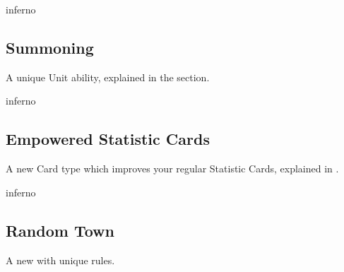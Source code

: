 \begin{multicols*}{2}
\vspace*{1em}
\begin{expansion}{inferno}
    \subsection*{Summoning}
    A unique Unit ability, explained in the  section.
\end{expansion}

\vspace*{1em}
\begin{expansion}{inferno}
    \subsection*{Empowered Statistic Cards}
    A new Card type which improves your regular Statistic Cards, explained in .
\end{expansion}

\vspace*{1em}
\begin{expansion}{inferno}
    \subsection*{Random Town}
    A new  with unique rules.
\end{expansion}
\end{multicols*}

